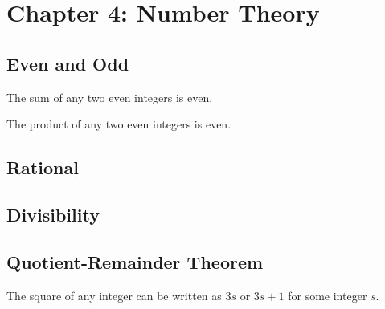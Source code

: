 \documentclass{article}
\begin{document}
\section{Chapter 4: Number Theory}



\subsection{Even and Odd}

The sum of any two even integers is even.

The product of any two even integers is even.

\subsection{Rational}

\subsection{Divisibility}

\subsection{Quotient-Remainder Theorem}


The square of any integer can be written as $3s$ or $3s+1$ for some integer $s$.
\end{document}
